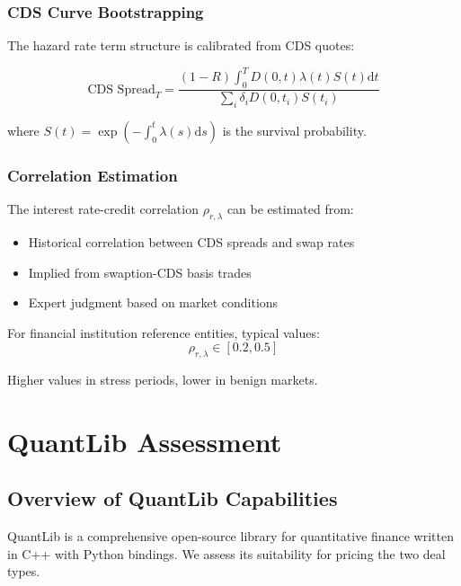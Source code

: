 \documentclass[11pt,a4paper]{article}
\theoremstyle{definition}
\newcommand{\diff}{\mathrm{d}}
\begin{document}
\subsubsection{CDS Curve Bootstrapping}

The hazard rate term structure is calibrated from CDS quotes:

\begin{equation}
\text{CDS Spread}_T = \frac{(1-R) \int_0^T D(0,t) \lambda(t) S(t) \diff t}{\sum_{i} \delta_i D(0,t_i) S(t_i)}
\end{equation}

where $S(t) = \exp(-\int_0^t \lambda(s) \diff s)$ is the survival probability.

\subsubsection{Correlation Estimation}

The interest rate-credit correlation $\rho_{r,\lambda}$ can be estimated from:
\begin{itemize}
    \item Historical correlation between CDS spreads and swap rates
    \item Implied from swaption-CDS basis trades
    \item Expert judgment based on market conditions
\end{itemize}

For financial institution reference entities, typical values:
\begin{equation}
\rho_{r,\lambda} \in [0.2, 0.5]
\end{equation}

Higher values in stress periods, lower in benign markets.

\section{QuantLib Assessment}

\subsection{Overview of QuantLib Capabilities}

QuantLib is a comprehensive open-source library for quantitative finance written in C++ with Python bindings. We assess its suitability for pricing the two deal types.
\end{document}
